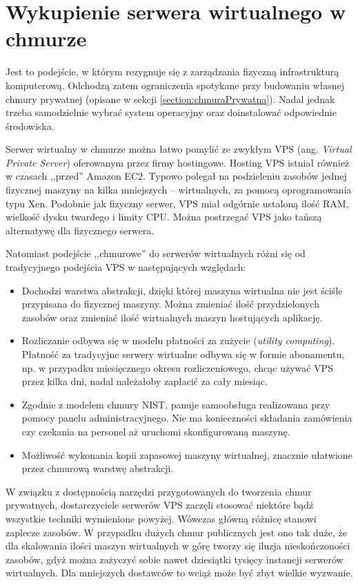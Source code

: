 \documentclass[12pt,a4paper,twoside,titlepage,openright]{book}
\begin{document}
\section{Wykupienie serwera wirtualnego w chmurze}\label{section:podejscieVm}

Jest to podejście, w którym rezygnuje się z zarządzania fizyczną infrastrukturą komputerową. Odchodzą zatem ograniczenia spotykane przy budowaniu własnej chmury prywatnej (opisane w sekcji  \ref{section:chmuraPrywatna}). Nadal jednak trzeba samodzielnie wybrać system operacyjny oraz doinstalować odpowiednie środowiska.

Serwer wirtualny w chmurze można łatwo pomylić ze zwykłym VPS (ang. \textit{Virtual Private Server}) oferowanym przez firmy hostingowe. Hosting VPS istniał również w czasach ,,przed'' Amazon EC2. Typowo polegał na podzieleniu zasobów jednej fizycznej maszyny na kilka mniejszych -- wirtualnych, za pomocą oprogramowania typu Xen. Podobnie jak fizyczny serwer, VPS miał odgórnie ustaloną ilość RAM, wielkość dysku twardego i limity CPU. Można postrzegać VPS jako tańszą alternatywę dla fizycznego serwera. 

Natomiast podejście ,,chmurowe'' do serwerów wirtualnych różni się od tradycyjnego podejścia VPS w następujących względach:
\begin{itemize}
\item Dochodzi warstwa abstrakcji, dzięki której maszyna wirtualna nie jest ściśle przypisana do fizycznej maszyny. Można zmieniać ilość przydzielonych zasobów oraz zmieniać ilość wirtualnych maszyn hostujących aplikację.
\item Rozliczanie odbywa się w modelu płatności za zużycie (\textit{utility computing}). Płatność za tradycyjne serwery wirtualne odbywa się w formie abonamentu, np. w przypadku miesięcznego okresu rozliczeniowego, chcąc używać VPS przez kilka dni, nadal należałoby zapłacić za cały miesiąc.
\item Zgodnie z modelem chmury NIST, panuje samoobsługa realizowana przy pomocy panelu administracyjnego. Nie ma konieczności składania zamówienia czy czekania na personel aż uruchomi skonfigurowaną maszynę.
\item Możliwość wykonania kopii zapasowej maszyny wirtualnej, znacznie ułatwione przez chmurową warstwę abstrakcji. 
\end{itemize}

W związku z dostępnością narzędzi przygotowanych do tworzenia chmur prywatnych, dostarczyciele serwerów VPS zaczęli stosować niektóre bądź wszystkie techniki wymienione powyżej. Wówczas główną różnicę stanowi zaplecze zasobów. W przypadku dużych chmur publicznych jest ono tak duże, że dla skalowania ilości maszyn wirtualnych w górę tworzy się iluzja nieskończoności zasobów, gdyż można zażyczyć sobie nawet dziesiątki tysięcy instancji serwerów wirtualnych. Dla mniejszych dostawców to wciąż może być zbyt wielkie wyzwanie.
\end{document}
